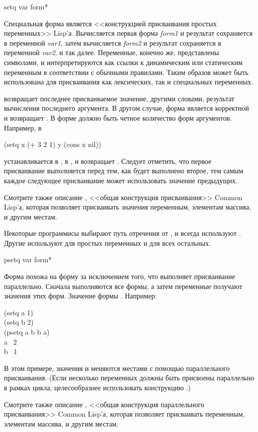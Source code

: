 \begin{defspec}
setq {var form}*

Специальная форма  является <<конструкцией присваивания простых переменных>> Lisp'а.
Вычисляется первая форма \emph{form1} и результат сохраняется в переменной
\emph{var1}, затем вычисляется \emph{form2} и результат сохраняется в переменной
\emph{var2}, и так далее.
Переменные, конечно же, представлены символами, и интерпретируются как ссылки к
динамическим или статическим переменным в соответствии с обычными правилами.
Таким образов  может быть использована для присваивания как
лексических, так и специальных переменных.

 возвращает последнее присваиваемое значение, другими словами,
результат вычисления последнего аргумента.
В другом случае, форма  является корректной и возвращает {\false}.
В форме должно быть четное количество форм аргументов.
Например, в 
\begin{lisp}
(setq x (+ 3 2 1) y (cons x nil))
\end{lisp}
 устанавливается в ,  в , и  возвращает
. Следует отметить, что первое присваивание выполняется перед тем, как
будет выполнено второе, тем самым каждое следующее присваивание может
использовать значение предыдущих.

\begin{newer}
Смотрите также описание , <<общая конструкция
присваивания>> Common Lisp'а, которая позволяет присваивать значения переменным,
элементам массива, и другим местам.

Некоторые программисы выбирают путь отречения от , и всегда используют
. Другие используют  для простых переменных и  для
всех остальных.
\end{newer}
\end{defspec}

\begin{defmac}
psetq {var form}*

Форма  похожа на форму  за исключением того, что выполняет
присваивание параллельно. Сначала выполняются все формы, а затем переменные
получают значения этих форм. Значение формы  {\false}.
Например:
\begin{lisp}
(setq a 1) \\
(setq b 2) \\
(psetq a b  b a) \\
a \EV\ 2 \\
b \EV\ 1
\end{lisp}
В этом примере, значения  и  меняются местами с помощью
параллельного присваивания.
(Если несколько переменных должны быть присвоены параллельно в рамках цикла,
целесообразнее использовать конструкцию .)

Смотрите также описание , <<общая конструкция параллельного
присваивания>> Common Lisp'а, которая позволяет присваивать переменным,
элементам массива, и другим местам.
\end{defmac}

